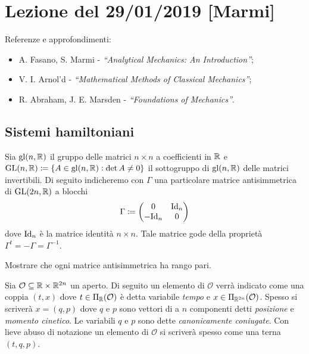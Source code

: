 \section{Lezione del 29/01/2019 [Marmi]}
Referenze e approfondimenti:
\begin{itemize}
    \item A. Fasano, S. Marmi - \emph{``Analytical Mechanics: An Introduction''};
    \item V. I. Arnol'd - \emph{``Mathematical Methods of Classical Mechanics''};
    \item R. Abraham, J. E. Marsden - \emph{``Foundations of Mechanics''}.
\end{itemize}

\subsection{Sistemi hamiltoniani}
Sia $ \mathrm{gl}(n, \mathbb{R}) $ il gruppo delle matrici $ n \times n $ a coefficienti in $ \mathbb{R} $ e $ {\mathrm{GL}(n, \mathbb{R}) \coloneqq \{A \in \mathrm{gl}(n, \mathbb{R}) : \det{A} \neq 0\}} $ il sottogruppo di $ \mathrm{gl}(n, \mathbb{R}) $ delle matrici invertibili. Di seguito indicheremo con $ \Gamma $ una particolare matrice antisimmetrica di $ \mathrm{GL}(2n, \mathbb{R}) $ a blocchi
\begin{equation}
    \Gamma \coloneqq
    \begin{pmatrix}
        0 & \mathrm{Id}_{n} \\
        -\mathrm{Id}_{n} & 0 \\
    \end{pmatrix}
\end{equation}
dove $ \mathrm{Id}_n $ è la matrice identità $ n \times n $. Tale matrice gode della proprietà $ \Gamma^t = -\Gamma = \Gamma^{-1} $. \\

\begin{exercise}
    Mostrare che ogni matrice antisimmetrica ha rango pari.
\end{exercise}

Sia $ \mathcal{O} \subseteq \mathbb{R} \times \mathbb{R}^{2n} $ un aperto. Di seguito un elemento di $ \mathcal{O} $ verrà indicato come una coppia $ (t, x) $ dove $ t \in \Pi_{\mathbb{R}}(\mathcal{O}) $ è detta variabile \emph{tempo} e $ x \in \Pi_{\mathbb{R}^{2n}}(\mathcal{O}) $. Spesso si scriverà $ x = (q, p) $ dove $ q $ e $ p $ sono vettori di a $ n $ componenti detti \emph{posizione} e \emph{momento cinetico}. Le variabili $ q $ e $ p $ sono dette \emph{canonicamente coniugate}. Con lieve abuso di notazione un elemento di $ \mathcal{O} $ si scriverà spesso come una terna $ (t, q, p) $. \\

